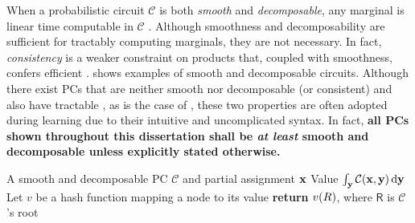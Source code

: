 When a probabilistic circuit $\mathcal{C}$ is both \emph{smooth} and \emph{decomposable}, any
marginal is linear time computable in $\mathcal{C}$ \citep{poon11,peharz15}. Although smoothness
and decomposability are sufficient for tractably computing marginals, they are not necessary. In
fact, \emph{consistency} is a weaker constraint on products that, coupled with smoothness, confers
efficient \mar{} \citep{poon11}.  shows examples of smooth and decomposable
circuits. Although there exist PCs that are neither smooth nor decomposable (or consistent) and
also have tractable \mar{}, as is the case of , these two properties are often adopted
during learning due to their intuitive and uncomplicated syntax. In fact, \textbf{all PCs shown
throughout this dissertation shall be \emph{at least} smooth and decomposable unless explicitly
stated otherwise.}

\begin{algorithm}[t]
  \caption{\mar}\label{alg:mar}
  \begin{algorithmic}[1]
    \Require A smooth and decomposable PC $\mathcal{C}$ and partial assignment $\mathbf{x}$
    \Ensure Value $\int_{\mathbf{y}}\mathcal{C}(\mathbf{x},\mathbf{y})\mathop{}\!\mathrm{d}\mathbf{y}$
    \State Let $v$ be a hash function mapping a node to its value
    \EndFor%
    \State \textbf{return} $v(\normalfont{R})$, where $\textsf{R}$ is $\mathcal{C}$'s root
  \end{algorithmic}
\end{algorithm}

